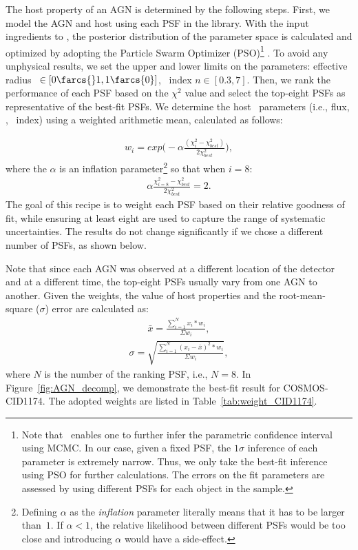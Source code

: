 \documentclass[apj]{emulateapj}
\begin{document}
The host property of an AGN is determined by the following steps. First, we model the AGN and host using each PSF in the library. With the input ingredients to \lenstronomy, the posterior distribution of the parameter space is calculated and optimized by adopting the Particle Swarm Optimizer (PSO)\footnote{Note that \lenstronomy\ enables one to further infer the parametric confidence interval using MCMC. In our case, given a fixed PSF, the $1\sigma$ inference of each parameter is extremely narrow. Thus, we only take the best-fit inference using PSO for further calculations. The errors on the fit parameters are assessed by using different PSFs for each object in the sample.} \citep{PSO}.
To avoid any unphysical results, we set the upper and lower limits on the parameters: effective radius \Reff\ $\in[0\farcs{}1,1\farcs{0}]$, \sersic\ index $n\in[0.3,7]$.
Then, we rank the performance of each PSF based on the $\chi^2$ value and select the top-eight PSFs as representative of the best-fit PSFs. We determine the host \sersic\ parameters (i.e., flux, \Reff, \sersic\ index) using a weighted arithmetic mean, calculated as follows:

\begin{eqnarray}
\label{eq:weights}
w_i = exp \big(- \alpha \frac{ (\chi_i ^2 - \chi_{best} ^2 )}{2 \chi_{best} ^2} \big),
\end{eqnarray} 
where the $\alpha$ is an inflation parameter\footnote{Defining $\alpha$ as the {\it inflation} parameter literally means that it has to be larger than~$1$. If $\alpha<1$, the relative likelihood between different PSFs would be too close and introducing $\alpha$ would have a side-effect.} so that when $i=8$:
\begin{eqnarray}
\label{eq:alpha}
\alpha \frac{ \chi_{i=8} ^2 - \chi_{best} ^2 }{2 \chi_{best} ^2} = 2.
\end{eqnarray} 
The goal of this recipe is to weight each PSF based on their relative goodness of fit, while ensuring at least eight are used to capture the range of systematic uncertainties. The results do not change significantly if we chose a different number of PSFs, as shown below.

Note that since each AGN was observed at a different location of the detector and at a different time, the top-eight PSFs usually vary from one AGN to another. Given the weights, the value of host properties and the root-mean-square ($\sigma$) error are calculated as:
\begin{eqnarray}
\label{eq:infer_value}
\bar{x}  =  \frac{  \sum_{i=1}^{N}   x_i * w_i  }{\Sigma w_i} ,
\end{eqnarray} 
\begin{eqnarray}
\label{eq:infer_scatter}
\sigma =   \sqrt{ \frac{  \sum_{i=1}^{N}   (x_i -  \bar{x} ) ^2 * w_i  }{\Sigma w_i} },
\end{eqnarray} 
where $N$ is the number of the ranking PSF, i.e., $N=8$.
\noindent In Figure~\ref{fig:AGN_decomp}, we demonstrate the best-fit result for COSMOS-CID1174. The adopted weights are listed in Table~\ref{tab:weight_CID1174}. 
\end{document}
